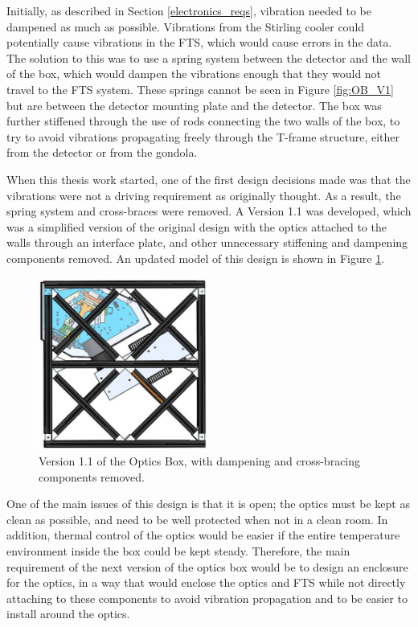 Initially, as described in Section \ref{electronics_reqs}, vibration needed to be dampened as much as possible. Vibrations from the Stirling cooler could potentially cause vibrations in the FTS, which would cause errors in the data. The solution to this was to use a spring system between the detector and the wall of the box, which would dampen the vibrations enough that they would not travel to the FTS system. These springs cannot be seen in Figure \ref{fig:OB_V1} but are between the detector mounting plate and the detector. The box was further stiffened through the use of rods connecting the two walls of the box, to try to avoid vibrations propagating freely through the T-frame structure, either from the detector or from the gondola.

When this thesis work started, one of the first design decisions made was that the vibrations were not a driving requirement as originally thought. As a result, the spring system and cross-braces were removed. A Version 1.1 was developed, which was a simplified version of the original design with the optics attached to the walls through an interface plate, and other unnecessary stiffening and dampening components removed. An updated model of this design is shown in Figure \ref{fig:OB_V1.1}.

\begin{figure}
    \centering
    \includegraphics[width=0.5\textwidth]{chap3_images/LIFE_V1_images/Optics_Box_V0_5_front_view.JPG}
    \caption{Version 1.1 of the Optics Box, with dampening and cross-bracing components removed.}
    \label{fig:OB_V1.1}
\end{figure}

One of the main issues of this design is that it is open; the optics must be kept as clean as possible, and need to be well protected when not in a clean room. In addition, thermal control of the optics would be easier if the entire temperature environment inside the box could be kept steady. Therefore, the main requirement of the next version of the optics box would be to design an enclosure for the optics, in a way that would enclose the optics and FTS while not directly attaching to these components to avoid vibration propagation and to be easier to install around the optics. 


